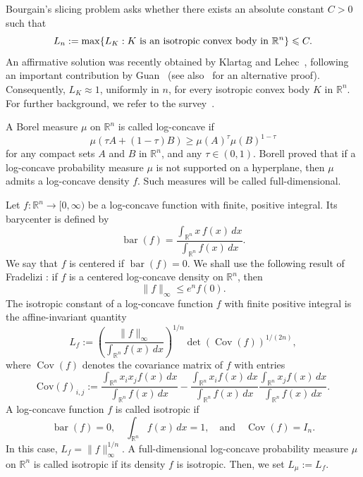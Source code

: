\documentclass[11pt,leqno]{article}
\theoremstyle{remark}
\numberwithin{equation}{section}
\newcommand{\ls}{\leqslant}
\newcommand{\gr}{\geqslant}
\begin{document}
Bourgain's slicing problem \cite{Bourgain-1986} asks whether there exists an absolute constant $C>0$ such that
\begin{equation}\label{eq:conjecture}
L_n:=\max\{ L_K:K\ \hbox{is an isotropic convex body in}\ \mathbb{R}^n\}\ls C.
\end{equation}
An affirmative solution was recently obtained by Klartag and Lehec~\cite{Klartag-Lehec-2025}, following an important
contribution by Guan~\cite{Guan-preprint} (see also~\cite{Bizeul-2025} for an alternative proof). 
Consequently, $L_K\approx 1$, uniformly in $n$, for every isotropic convex body $K$ in $\mathbb{R}^n$.
For further background, we refer to the survey~\cite{Giannopoulos-Pafis-Tziotziou-2025}.

\medskip 

A Borel measure $\mu$ on $\mathbb R^n$ is called log-concave if 
$$\mu(\tau A+(1-\tau)B) \gr \mu(A)^{\tau}\mu(B)^{1-\tau}$$ for any compact sets $A$
and $B$ in ${\mathbb R}^n$, and any $\tau \in (0,1)$. 
Borell \cite{Borell-1974} proved that if a log-concave probability measure $\mu $ is not supported 
on a hyperplane, then $\mu$ admits a log-concave density $f$. Such measures will be called full-dimensional.

Let $f:\mathbb{R}^n\to [0,\infty)$ be a log-concave function with finite, positive integral. 
Its barycenter is defined by
$$\operatorname{bar}(f)= \frac{\int_{\mathbb{R}^n} x\, f(x)\, dx}{\int_{\mathbb{R}^n} f(x)\, dx}.$$
We say that $f$ is centered if $\operatorname{bar}(f)=0$.
We shall use the following result of Fradelizi \cite{Fradelizi-1997}: if $f$ is a centered log-concave density on ${\mathbb R}^n$, then
\begin{equation}\label{eq:frad-2}\|f\|_{\infty }\ls e^nf(0).\end{equation}
The isotropic constant of a log-concave function $f$ with finite positive integral is the affine-invariant quantity
\begin{equation}\label{eq:definition-isotropic}
L_f:= \left( \frac{\|f\|_{\infty}}{\int_{\mathbb{R}^n} f(x)\, dx} \right)^{1/n} \det(\operatorname{Cov}(f))^{1/(2n)},
\end{equation}
where $\operatorname{Cov}(f)$ denotes the covariance matrix of $f$ with entries
\begin{equation*}
\textrm{Cov}(f)_{i,j}:=\frac{\int_{\mathbb{R}^n}x_ix_j f(x)\,dx}{\int_{\mathbb{R}^n} f(x)\,dx}-\frac{\int_{\mathbb{R}^n}x_i f(x)\,dx}{\int_{\mathbb{R}^n} f(x)\,dx}\frac{\int_{\mathbb{R}^n}x_j f(x)\,dx}{\int_{\mathbb{R}^n} f(x)\,dx}.
\end{equation*}
A log-concave function $f$ is called isotropic if
$$\operatorname{bar}(f)=0,\quad \int_{\mathbb{R}^n}f(x)\,dx=1,\quad \text{and} \quad \operatorname{Cov}(f)=I_n.$$
In this case, $L_f=\|f\|_{\infty}^{1/n}$. A full-dimensional log-concave probability measure $\mu$ on $\mathbb{R}^n$ is called isotropic if its
density $f$ is isotropic. Then, we set $L_{\mu}:=L_f$.
\end{document}
